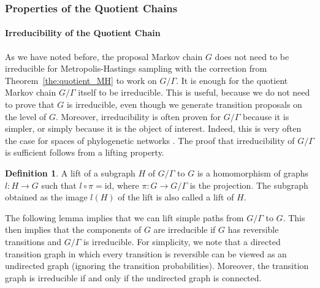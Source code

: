 \documentclass{article}
\theoremstyle{definition}
\newtheorem{definition}{Definition}
\begin{document}


\subsubsection{Properties of the Quotient Chains}
\paragraph{Irreducibility of the Quotient Chain}
As we have noted before, the proposal Markov chain $G$ does not need to be irreducible for Metropolis-Hastings sampling with the correction from Theorem~\ref{the:quotient_MH} to work on $G/\Gamma$. It is enough for the quotient Markov chain $G/\Gamma$ itself to be irreducible. This is useful, because we do not need to prove that $G$ is irreducible, even though we generate transition proposals on the level of $G$. Moreover, irreducibility is often proven for $G/\Gamma$ because it is simpler, or simply because it is the object of interest. Indeed, this is very often the case for spaces of phylogenetic networks \cite[e.g.][]{huber2016spaces, gambette2017rearrangement, janssen2019rearrangement, thesis_janssen, klawitter2020spaces, ERDOS2021205}. The proof that irreducibility of $G/\Gamma$ is sufficient follows from a lifting property.


\begin{definition}
    A lift of a subgraph $H$ of $G/\Gamma$ to $G$ is a homomorphism of graphs $l:H\to G$ such that $l\circ \pi = \mathrm{id}$, where $\pi: G\to G/\Gamma$ is the projection. The subgraph obtained as the image $l(H)$ of the lift is also called a lift of $H$.
\end{definition}

The following lemma implies that we can lift simple paths from $G/\Gamma$ to $G$. This then implies that the components of $G$ are irreducible if $G$ has reversible transitions and $G/\Gamma$ is irreducible. For simplicity, we note that a directed transition graph in which every transition is reversible can be viewed as an undirected graph (ignoring the transition probabilities). Moreover, the transition graph is irreducible if and only if the undirected graph is connected.
\end{document}
